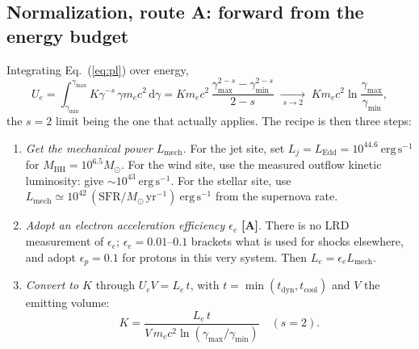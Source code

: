 \documentclass[11pt,a4paper]{article}
\newcommand{\ergs}{\ \mathrm{erg\,s^{-1}}}
\begin{document}
\subsection{Normalization, route A: forward from the energy budget}
\label{sec:normA}
Integrating Eq.~(\ref{eq:pl}) over energy,
\begin{equation}
  U_e=\int_{\gamma_{\min}}^{\gamma_{\max}}K\gamma^{-s}\,\gamma m_ec^{2}\,\mathrm d\gamma
     =K m_ec^{2}\,
      \frac{\gamma_{\max}^{2-s}-\gamma_{\min}^{2-s}}{2-s}
  \;\xrightarrow[\;s\to2\;]{}\;
  K m_ec^{2}\ln\!\frac{\gamma_{\max}}{\gamma_{\min}},
  \label{eq:norm}
\end{equation}
the $s=2$ limit being the one that actually applies. The recipe is then three
steps:
\begin{enumerate}
\item \emph{Get the mechanical power $L_{\mathrm{mech}}$.} For the jet site,
      \citet{Kuze2026} set $L_j=L_{\mathrm{Edd}}=10^{44.6}\ergs$ for
      $M_{\mathrm{BH}}=10^{6.5}M_\odot$. For the wind site, use the measured
      outflow kinetic luminosity: \citet{Korber2026} give
      $\sim\!10^{43}\ergs$. For the stellar site, use
      $L_{\mathrm{mech}}\simeq10^{42}\,(\mathrm{SFR}/M_\odot\,\mathrm{yr^{-1}})\ergs$
      from the supernova rate.
\item \emph{Adopt an electron acceleration efficiency $\epsilon_e$}
      \textbf{[A]}. There is no LRD measurement of $\epsilon_e$;
      $\epsilon_e=0.01$--$0.1$ brackets what is used for shocks elsewhere, and
      \citet{Kuze2026} adopt $\epsilon_p=0.1$ for protons in this very system.
      Then $L_e=\epsilon_e L_{\mathrm{mech}}$.
\item \emph{Convert to $K$} through $U_eV=L_e\,t$, with
      $t=\min(t_{\mathrm{dyn}},t_{\mathrm{cool}})$ and $V$ the emitting volume:
      \begin{equation}
        K=\frac{L_e\,t}{V\,m_ec^{2}\ln(\gamma_{\max}/\gamma_{\min})}\quad(s=2).
      \end{equation}
\end{enumerate}
\end{document}
